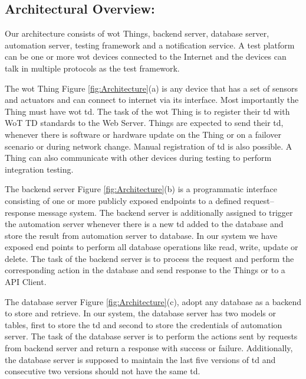 \documentclass[conference]{IEEEtran}
\theoremstyle{definition}
\begin{document}
\subsection{Architectural Overview: }
Our architecture consists of \ac{wot} Things, backend server, database server, automation server, testing framework and a notification service. 
A test platform can be one or more \ac{wot} devices connected to the Internet and the devices can talk in multiple protocols as the test framework. 

The \ac{wot} Thing Figure \ref{fig:Architecture}(a) is any device that has a set of sensors and actuators and can connect to internet via its interface. 
Most importantly the Thing must have \ac{wot} \ac{td}. 
The task of the \ac{wot} Thing is to register their \ac{td} with WoT TD standards to the Web Server. 
Things are expected to send their \ac{td}, whenever there is software or hardware update on the Thing or on a failover scenario or during network change.
Manual registration of \ac{td} is also possible.
A Thing can also communicate with other devices during testing to perform integration testing.

The backend server Figure \ref{fig:Architecture}(b) is a programmatic interface consisting of one or more publicly exposed endpoints to a defined request–response message system. 
The backend server is additionally assigned to trigger the automation server whenever there is a new \ac{td} added to the database and store the result from automation server to database.
In our system we have exposed end points to perform all database operations like read, write, update or delete. 
The task of the backend server is to process the request and perform the corresponding action in the database and send response to the Things or to a API Client.

The database server Figure \ref{fig:Architecture}(c), adopt any database as a backend to store and retrieve.  
In our system, the database server has two models or tables, first to store the \ac{td} and second to store the credentials of automation server. 
The task of the database server is to perform the actions sent by requests from backend server and return a response with success or failure. 
Additionally, the database server is supposed to maintain the last five versions of \ac{td} and consecutive two versions should not have the same \ac{td}. 
\end{document}
